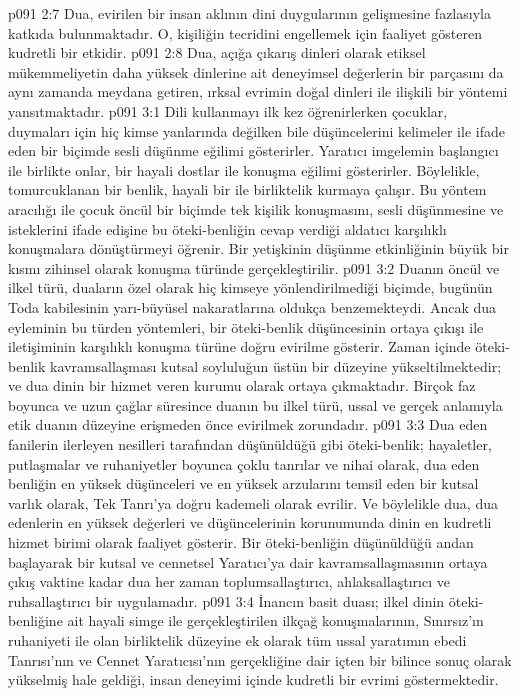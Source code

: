 \vs p091 2:7 Dua, evirilen bir insan aklının dini duygularının gelişmesine fazlasıyla katkıda bulunmaktadır. O, kişiliğin tecridini engellemek için faaliyet gösteren kudretli bir etkidir.
\vs p091 2:8 Dua, açığa çıkarış dinleri olarak etiksel mükemmeliyetin daha yüksek dinlerine ait deneyimsel değerlerin bir parçasını da aynı zamanda meydana getiren, ırksal evrimin doğal dinleri ile ilişkili bir yöntemi yansıtmaktadır.
\vs p091 3:1 Dili kullanmayı ilk kez öğrenirlerken çocuklar, duymaları için hiç kimse yanlarında değilken bile düşüncelerini kelimeler ile ifade eden bir biçimde sesli düşünme eğilimi gösterirler. Yaratıcı imgelemin başlangıcı ile birlikte onlar, bir hayali dostlar ile konuşma eğilimi gösterirler. Böylelikle, tomurcuklanan bir benlik, hayali bir ile birliktelik kurmaya çalışır. Bu yöntem aracılığı ile çocuk öncül bir biçimde tek kişilik konuşmasını, sesli düşünmesine ve isteklerini ifade edişine bu öteki\hyp{}benliğin cevap verdiği aldatıcı karşılıklı konuşmalara dönüştürmeyi öğrenir. Bir yetişkinin düşünme etkinliğinin büyük bir kısmı zihinsel olarak konuşma türünde gerçekleştirilir.
\vs p091 3:2 Duanın öncül ve ilkel türü, duaların özel olarak hiç kimseye yönlendirilmediği biçimde, bugünün Toda kabilesinin yarı\hyp{}büyüsel nakaratlarına oldukça benzemekteydi. Ancak dua eyleminin bu türden yöntemleri, bir öteki\hyp{}benlik düşüncesinin ortaya çıkışı ile iletişiminin karşılıklı konuşma türüne doğru evirilme gösterir. Zaman içinde öteki\hyp{}benlik kavramsallaşması kutsal soyluluğun üstün bir düzeyine yükseltilmektedir; ve dua dinin bir hizmet veren kurumu olarak ortaya çıkmaktadır. Birçok faz boyunca ve uzun çağlar süresince duanın bu ilkel türü, ussal ve gerçek anlamıyla etik duanın düzeyine erişmeden önce evirilmek zorundadır.
\vs p091 3:3 Dua eden fanilerin ilerleyen nesilleri tarafından düşünüldüğü gibi öteki\hyp{}benlik; hayaletler, putlaşmalar ve ruhaniyetler boyunca çoklu tanrılar ve nihai olarak, dua eden benliğin en yüksek düşünceleri ve en yüksek arzularını temsil eden bir kutsal varlık olarak, Tek Tanrı’ya doğru kademeli olarak evrilir. Ve böylelikle dua, dua edenlerin en yüksek değerleri ve düşüncelerinin korunumunda dinin en kudretli hizmet birimi olarak faaliyet gösterir. Bir öteki\hyp{}benliğin düşünüldüğü andan başlayarak bir kutsal ve cennetsel Yaratıcı’ya dair kavramsallaşmasının ortaya çıkış vaktine kadar dua her zaman toplumsallaştırıcı, ahlaksallaştırıcı ve ruhsallaştırıcı bir uygulamadır.
\vs p091 3:4 İnancın basit duası; ilkel dinin öteki\hyp{}benliğine ait hayali simge ile gerçekleştirilen ilkçağ konuşmalarının, Sınırsız’ın ruhaniyeti ile olan birliktelik düzeyine ek olarak tüm ussal yaratımın ebedi Tanrısı’nın ve Cennet Yaratıcısı’nın gerçekliğine dair içten bir bilince sonuç olarak yükselmiş hale geldiği, insan deneyimi içinde kudretli bir evrimi göstermektedir.
